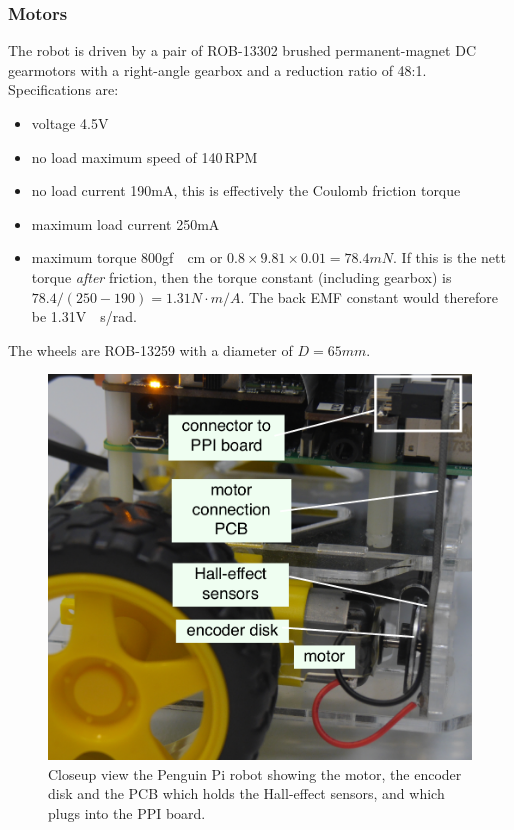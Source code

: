 \documentclass[11pt,fleqn]{article}
\begin{document}
\subsubsection{Motors}
The robot is driven by a pair of ROB-13302 brushed permanent-magnet DC gearmotors with a right-angle gearbox and a reduction ratio of 48:1.  Specifications are:
\begin{itemize}
\item voltage 4.5\unit{V}
\item no load maximum speed of 140\,RPM
\item no load current 190\unit{mA}, this is effectively the Coulomb friction torque
\item maximum load current 250\unit{mA}
\item maximum torque 800\unit{gf \cdot cm} or $0.8 \times 9.81 \times 0.01 =  78.4\unit{mN}$. 
If this is the nett torque \textit{after} friction, then  the torque constant (including gearbox) is $78.4/(250-190) =1.31\unit{N \cdot m/A}$.
The back EMF constant would therefore be 1.31\unit{V\cdot s/rad}.
\end{itemize}

The wheels are ROB-13259 with a diameter of $D=65\unit{mm}$.

\begin{figure}
\centering
\includegraphics[width=12cm]{motor-annotated.pdf}
\caption{Closeup view the Penguin Pi robot showing the motor, the encoder disk and the PCB which holds the Hall-effect sensors, and 
which plugs into the PPI board.}\label{fig:robot-closeup}
\end{figure}
\end{document}
